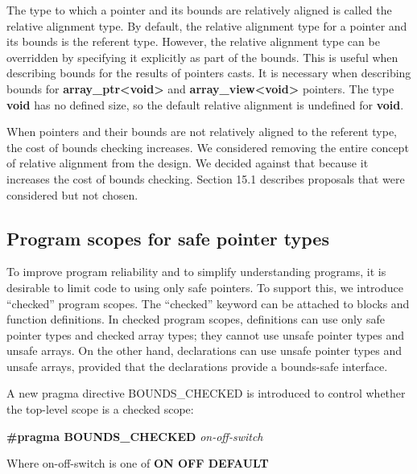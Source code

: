 \documentclass[]{article}
\begin{document}
The type to which a pointer and its bounds are relatively aligned is
called the relative alignment type. By default, the relative alignment
type for a pointer and its bounds is the referent type. However, the
relative alignment type can be overridden by specifying it explicitly as
part of the bounds. This is useful when describing bounds for the
results of pointers casts. It is necessary when describing bounds for
\textbf{array\_ptr\textless{}void\textgreater{}} and
\textbf{array\_view\textless{}void\textgreater{}} pointers. The type
\textbf{void} has no defined size, so the default relative alignment is
undefined for \textbf{void}.

When pointers and their bounds are not relatively aligned to the
referent type, the cost of bounds checking increases. We considered
removing the entire concept of relative alignment from the design. We
decided against that because it increases the cost of bounds checking.
Section 15.1 describes proposals that were considered but not chosen.

\subsection{\texorpdfstring{\protect\hypertarget{ux5fToc424307688}{}{\protect\hypertarget{ux5fToc426641064}{}{\protect\hypertarget{ux5fToc435434924}{}{\protect\hypertarget{ux5fToc437460745}{}{\protect\hypertarget{ux5fToc440445422}{}{\protect\hypertarget{ux5fToc440449204}{}{\protect\hypertarget{ux5fToc440551854}{}{}}}}}}}Program
scopes for safe pointer
types}{Program scopes for safe pointer types}}\label{program-scopes-for-safe-pointer-types}

To improve program reliability and to simplify understanding programs,
it is desirable to limit code to using only safe pointers. To support
this, we introduce ``checked'' program scopes. The ``checked'' keyword
can be attached to blocks and function definitions. In checked program
scopes, definitions can use only safe pointer types and checked array
types; they cannot use unsafe pointer types and unsafe arrays. On the
other hand, declarations can use unsafe pointer types and unsafe arrays,
provided that the declarations provide a bounds-safe interface.

A new pragma directive BOUNDS\_CHECKED is introduced to control whether
the top-level scope is a checked scope:

\textbf{\#pragma BOUNDS\_CHECKED} \emph{on-off-switch}

Where on-off-switch is one of \textbf{ON OFF DEFAULT}
\end{document}
